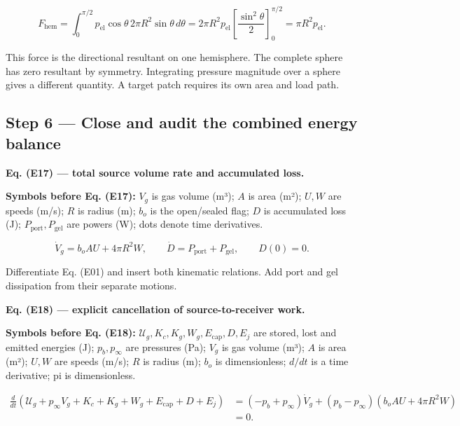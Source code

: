 \documentclass[11pt]{article}
\begin{document}
\begin{equation*}
F_{\mathrm{hem}}=\int_0^{\pi/2}p_{\mathrm{el}}\cos\theta\,2\pi R^2\sin\theta\,d\theta
=2\pi R^2p_{\mathrm{el}}\left[\frac{\sin^2\theta}{2}\right]_0^{\pi/2}
=\pi R^2p_{\mathrm{el}}.
\end{equation*}

This force is the directional resultant on one hemisphere. The complete sphere has zero resultant by symmetry. Integrating pressure magnitude over a sphere gives a different quantity. A target patch requires its own area and load path.



\subsection*{Step 6 — Close and audit the combined energy balance}

\textbf{Eq. (E17) — total source volume rate and accumulated loss.}


\textbf{Symbols before Eq. (E17):} \(V_g\) is gas volume (m³); \(A\) is area (m²); \(U,W\) are speeds (m/s); \(R\) is radius (m); \(b_o\) is the open/sealed flag; \(D\) is accumulated loss (J); \(P_{\mathrm{port}},P_{\mathrm{gel}}\) are powers (W); dots denote time derivatives.



\begin{equation*}
\dot V_g=b_oAU+4\pi R^2W,\qquad
\dot D=P_{\mathrm{port}}+P_{\mathrm{gel}},\qquad D(0)=0.
\end{equation*}

Differentiate Eq. (E01) and insert both kinematic relations. Add port and gel dissipation from their separate motions.


\textbf{Eq. (E18) — explicit cancellation of source-to-receiver work.}


\textbf{Symbols before Eq. (E18):} \(\mathcal U_g,K_c,K_g,W_g,E_{\mathrm{cap}},D,E_j\) are stored, lost and emitted energies (J); \(p_b,p_\infty\) are pressures (Pa); \(V_g\) is gas volume (m³); \(A\) is area (m²); \(U,W\) are speeds (m/s); \(R\) is radius (m); \(b_o\) is dimensionless; \(d/dt\) is a time derivative; pi is dimensionless.



\begin{equation*}
\begin{aligned}
\frac{d}{dt}(\mathcal U_g+p_\infty V_g+K_c+K_g+W_g+E_{\mathrm{cap}}+D+E_j)
&=(-p_b+p_\infty)\dot V_g+(p_b-p_\infty)(b_oAU+4\pi R^2W)\\
&=0.
\end{aligned}
\end{equation*}
\end{document}

